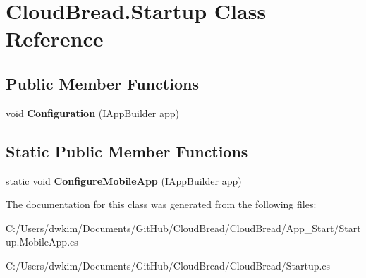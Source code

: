 \hypertarget{a00183}{}\section{Cloud\+Bread.\+Startup Class Reference}
\label{a00183}
\subsection*{Public Member Functions}
\begin{DoxyCompactItemize}
\item 
void {\bfseries Configuration} (I\+App\+Builder app)\hypertarget{a00183_a6731744fcca213fea7ff5df81f4d762c}{}\label{a00183_a6731744fcca213fea7ff5df81f4d762c}

\end{DoxyCompactItemize}
\subsection*{Static Public Member Functions}
\begin{DoxyCompactItemize}
\item 
static void {\bfseries Configure\+Mobile\+App} (I\+App\+Builder app)\hypertarget{a00183_a56296177abc17b5405fdce16c947df5b}{}\label{a00183_a56296177abc17b5405fdce16c947df5b}

\end{DoxyCompactItemize}


The documentation for this class was generated from the following files\+:\begin{DoxyCompactItemize}
\item 
C\+:/\+Users/dwkim/\+Documents/\+Git\+Hub/\+Cloud\+Bread/\+Cloud\+Bread/\+App\+\_\+\+Start/Startup.\+Mobile\+App.\+cs\item 
C\+:/\+Users/dwkim/\+Documents/\+Git\+Hub/\+Cloud\+Bread/\+Cloud\+Bread/Startup.\+cs\end{DoxyCompactItemize}
